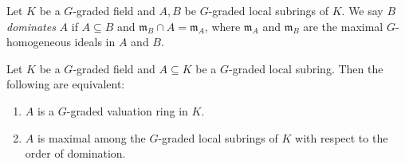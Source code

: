 \begin{definition}
    Let $K$ be a $G$-graded field and $A,B$ be $G$-graded local subrings of $K$. We say $B$ \emph{dominates} $A$ if $A\subseteq B$ and $\mathfrak{m}_B\cap A=\mathfrak{m}_A$, where $\mathfrak{m}_A$ and $\mathfrak{m}_B$ are the maximal $G$-homogeneous ideals in $A$ and $B$. 
\end{definition}

\begin{proposition}\label{prop-valuationringchar}
    Let $K$ be a $G$-graded field and $A\subseteq K$ be a $G$-graded local subring. Then the following are equivalent:
    \begin{enumerate}
        \item $A$ is a $G$-graded valuation ring in $K$.
        \item $A$ is maximal among the $G$-graded local subrings of $K$ with respect to the order of domination.
    \end{enumerate}
\end{proposition}
